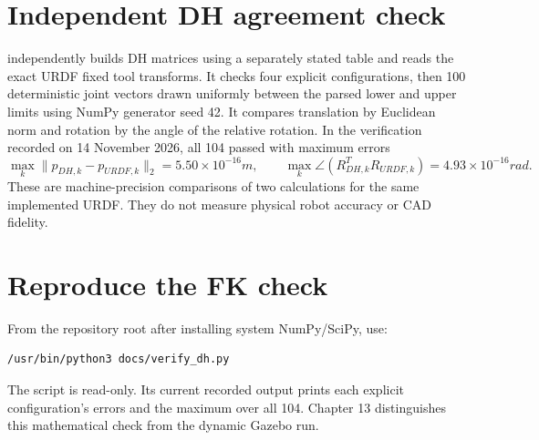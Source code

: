\section{Independent DH agreement check}
 independently builds DH matrices using a separately
stated table and reads the exact URDF fixed tool transforms. It checks four
explicit configurations, then 100 deterministic joint vectors drawn uniformly
between the parsed lower and upper limits using NumPy generator seed 42. It
compares translation by Euclidean norm and rotation by the angle of the
relative rotation. In the verification recorded on 14 November 2026, all 104
passed with maximum errors
\begin{equation}
 \max_k\|p_{DH,k}-p_{URDF,k}\|_2=5.50\times10^{-16}\si{m},\qquad
 \max_k\angle(R_{DH,k}^{T}R_{URDF,k})=4.93\times10^{-16}\si{rad}.
\end{equation}
These are machine-precision comparisons of two calculations for the same
implemented URDF. They do not measure physical robot accuracy or CAD fidelity.

\section{Reproduce the FK check}
From the repository root after installing system NumPy/SciPy, use:
\begin{lstlisting}[language=bash]
/usr/bin/python3 docs/verify_dh.py
\end{lstlisting}
The script is read-only. Its current recorded output prints each explicit
configuration's errors and the maximum over all 104. Chapter 13 distinguishes
this mathematical check from the dynamic Gazebo run.
